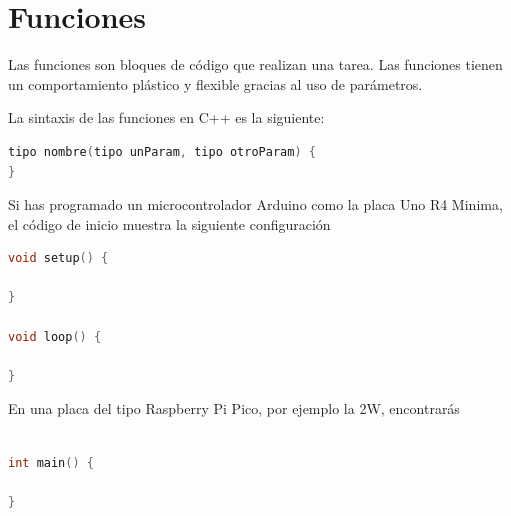 \documentclass[../principal.tex]{subfiles}
\begin{document}
\chapter{Funciones}

Las funciones son bloques de código que realizan una tarea. Las funciones tienen un comportamiento plástico y flexible gracias al uso de parámetros.

La sintaxis de las funciones en C++ es la siguiente:

\begin{lstlisting}[language=C++]
tipo nombre(tipo unParam, tipo otroParam) {
}
\end{lstlisting}

Si has programado un microcontrolador Arduino como la placa Uno R4 Minima, el código de inicio muestra la siguiente configuración

\begin{lstlisting}[language=C++]
void setup() {

}

void loop() {

}
\end{lstlisting}


En una placa del tipo Raspberry Pi Pico, por ejemplo la 2W, encontrarás

\begin{lstlisting}[language=C++]
    
int main() {

}
\end{lstlisting}


\newpage
\end{document}

